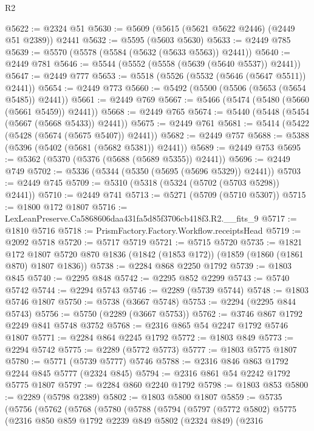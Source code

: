 \begin{lexlean}{R2}
\begin{coremodule}
@5622 := @2324 @51
@5630 := @5609 (@5615 (@5621 @5622 @2446) (@2449 @51 @2389)) @2441
@5632 := @5595 (@5603 @5630)
@5633 := @2449 @785
@5639 := @5570 (@5578 (@5584 (@5632 (@5633 @5563)) @2441))
@5640 := @2449 @781
@5646 := @5544 (@5552 (@5558 (@5639 (@5640 @5537)) @2441))
@5647 := @2449 @777
@5653 := @5518 (@5526 (@5532 (@5646 (@5647 @5511)) @2441))
@5654 := @2449 @773
@5660 := @5492 (@5500 (@5506 (@5653 (@5654 @5485)) @2441))
@5661 := @2449 @769
@5667 := @5466 (@5474 (@5480 (@5660 (@5661 @5459)) @2441))
@5668 := @2449 @765
@5674 := @5440 (@5448 (@5454 (@5667 (@5668 @5433)) @2441))
@5675 := @2449 @761
@5681 := @5414 (@5422 (@5428 (@5674 (@5675 @5407)) @2441))
@5682 := @2449 @757
@5688 := @5388 (@5396 (@5402 (@5681 (@5682 @5381)) @2441))
@5689 := @2449 @753
@5695 := @5362 (@5370 (@5376 (@5688 (@5689 @5355)) @2441))
@5696 := @2449 @749
@5702 := @5336 (@5344 (@5350 (@5695 (@5696 @5329)) @2441))
@5703 := @2449 @745
@5709 := @5310 (@5318 (@5324 (@5702 (@5703 @5298)) @2441))
@5710 := @2449 @741
@5713 := @5271 (@5709 (@5710 @5307))
@5715 := @1800 @172 @1807
@5716 := LexLeanPreserve.Ca5868606daa431fa5d85f3706cb418f3.R2.__fits_9
@5717 := @1810 @5716
@5718 := PrismFactory.Factory.Workflow.receiptsHead
@5719 := @2092 @5718
@5720 := @5717 @5719
@5721 := @5715 @5720
@5735 := @1821
    @172
    @1807
    @5720
    @870
    @1836
    (@1842 (@1853 @172))
    (@1859 (@1860 (@1861 @870) @1807 @1836))
@5738 := @2284 @868 @2250 @1792
@5739 := @1803 @845
@5740 := @2295 @848
@5742 := @2295 @852 @2299
@5743 := @5740 @5742
@5744 := @2294 @5743
@5746 := @2289 (@5739 @5744)
@5748 := @1803 @5746 @1807
@5750 := @5738 (@3667 @5748)
@5753 := @2294 (@2295 @844 @5743)
@5756 := @5750 (@2289 (@3667 @5753))
@5762 := @3746 @867 @1792 @2249 @841 @5748 @3752
@5768 := @2316 @865 @54 @2247 @1792 @5746 @1807
@5771 := @2284 @864 @2245 @1792
@5772 := @1803 @849
@5773 := @2294 @5742
@5775 := @2289 (@5772 @5773)
@5777 := @1803 @5775 @1807
@5780 := @5771 (@5739 @5777) @5746
@5788 := @2316 @846 @863 @1792 @2244 @845 @5777 (@2324 @845)
@5794 := @2316 @861 @54 @2242 @1792 @5775 @1807
@5797 := @2284 @860 @2240 @1792
@5798 := @1803 @853
@5800 := @2289 (@5798 @2389)
@5802 := @1803 @5800 @1807
@5859 := @5735
    (@5756
      (@5762
        (@5768
          (@5780
            (@5788
              (@5794
                (@5797
                  (@5772 @5802)
                  @5775
                  (@2316
                    @850
                    @859
                    @1792
                    @2239
                    @849
                    @5802
                    (@2324 @849)
                    (@2316

\end{coremodule}
\end{lexlean}

